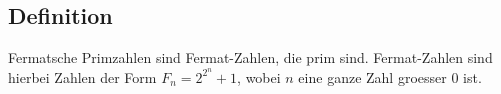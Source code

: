 \subsection{Definition}
Fermatsche Primzahlen sind Fermat-Zahlen, die prim sind. Fermat-Zahlen sind hierbei Zahlen der Form $F_n = 2^{2^n} + 1$, wobei $n$ eine ganze Zahl groesser $0$ ist.
